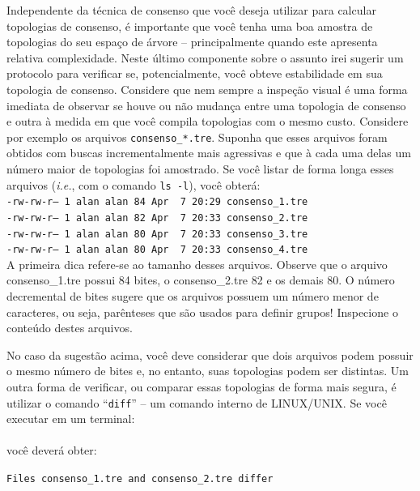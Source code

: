 \begin{refsection}
Independente da técnica de consenso que você deseja utilizar para calcular topologias de consenso, é importante que você tenha uma boa amostra de topologias do seu espaço de árvore -- principalmente quando este apresenta relativa complexidade. Neste último componente sobre o assunto irei sugerir um protocolo para verificar se, potencialmente, você obteve estabilidade em sua topologia de consenso. Considere que nem sempre a inspeção visual é uma forma imediata de observar se houve ou não mudança entre uma topologia de consenso e outra à medida em que você compila topologias com o mesmo custo. Considere por exemplo os arquivos \texttt{consenso\_*.tre}. Suponha que esses arquivos foram obtidos com buscas incrementalmente mais agressivas e que à cada uma delas um número maior de topologias foi amostrado. Se você listar de forma longa esses arquivos (\textit{i.e.}, com o comando \texttt{ls -l}), você obterá:\\

\noindent\texttt{-rw-rw-r--~1~alan~alan~84~Apr~~7~20:29~consenso\_1.tre}\\
\texttt{-rw-rw-r--~1~alan~alan~82~Apr~~7~20:33~consenso\_2.tre}\\
\texttt{-rw-rw-r--~1~alan~alan~80~Apr~~7~20:33~consenso\_3.tre}\\
\texttt{-rw-rw-r--~1~alan~alan~80~Apr~~7~20:33~consenso\_4.tre}\\

A primeira dica refere-se ao tamanho desses arquivos. Observe que o arquivo consenso\_1.tre possui 84 bites, o consenso\_2.tre 82 e os demais 80. O número decremental de bites sugere que os arquivos possuem um número menor de caracteres, ou seja, parênteses que são usados para definir grupos! Inspecione o conteúdo destes arquivos.

No caso da sugestão acima, você deve considerar que dois arquivos podem possuir o mesmo número de bites e, no entanto, suas topologias podem ser distintas. Um outra forma de verificar, ou comparar essas topologias de forma mais segura, é utilizar o comando ``\texttt{diff}'' -- um comando interno de LINUX/UNIX. Se você executar em um terminal:\\

\\

você deverá obter:

\texttt{Files consenso\_1.tre and consenso\_2.tre differ}\\


\end{refsection}
